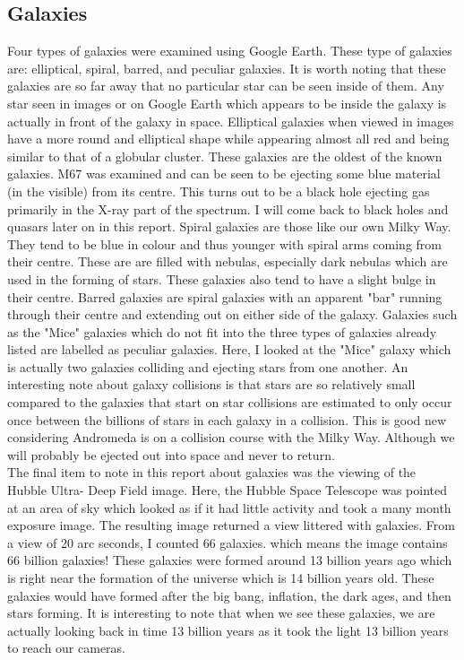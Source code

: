 \documentclass{article}
\begin{document}
\subsection{Galaxies}
Four types of galaxies were examined using Google Earth. These type of galaxies are:
elliptical, spiral, barred, and peculiar galaxies. It is worth noting that these
galaxies are so far away that no particular star can be seen inside of them. Any star
seen in images or on Google Earth which appears to be inside the galaxy is actually in
front of the galaxy in space. Elliptical galaxies when viewed in images have a more
round and elliptical shape while appearing almost all red and being similar to that
of a globular cluster. These galaxies are the oldest of the known galaxies. M67 was
examined and can be seen to be ejecting some blue material (in the visible) from 
its centre. This turns out to be a black hole ejecting gas primarily in the X-ray
part of the spectrum. I will come back to black holes and quasars later on in this report.
Spiral galaxies are those like our own Milky Way. They tend to be blue in colour and thus
younger with spiral arms coming from their centre. These are are filled with nebulas,
especially dark nebulas which are used in the forming of stars. These galaxies
also tend to have a slight bulge in their centre. Barred galaxies are spiral galaxies
with an apparent "bar" running through their centre and extending out on either side of
the galaxy. Galaxies such as the "Mice" galaxies which do not fit into the three types
of galaxies already listed are labelled as peculiar galaxies. Here, I looked at the "Mice"
galaxy which is actually two galaxies colliding and ejecting stars from one another. 
An interesting note about galaxy collisions is that stars are so relatively small compared
to the galaxies that start on star collisions are estimated to only occur once between
the billions of stars in each galaxy in a collision. This is good new considering Andromeda
is on a collision course with the Milky Way. Although we will probably be ejected out into 
space and never to return.\\

The final item to note in this report about galaxies was the viewing of the Hubble Ultra-
Deep Field image. Here, the Hubble Space Telescope was pointed at an area of sky which
looked as if it had little activity and took a many month exposure image. The resulting
image returned a view littered with galaxies. From a view of 20 arc seconds, I counted 66
galaxies. which means the image contains 66 billion galaxies! These galaxies were formed
around 13 billion years ago which is right near the formation of the universe which
is 14 billion years old. These galaxies would have formed after the big bang, inflation,
the dark ages, and then stars forming. It is interesting to note that when we see these galaxies,
we are actually looking back in time 13 billion years as it took the light 13 billion
years to reach our cameras.
\end{document}
